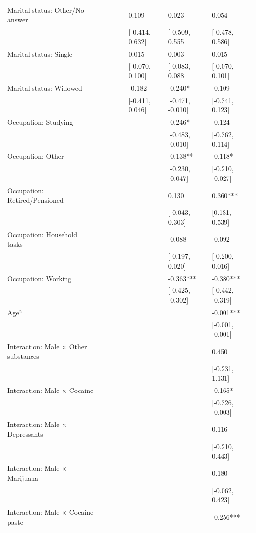 \documentclass[
  spanish,
  10pt,
]{article}
\begin{document}
\begin{table}[H]
{\begin{tabular}[t]{llllllll}
Marital status: Other/No answer &  &  &  &  & 0.109 & 0.023 & 0.054\\
 &  &  &  &  & {}[-0.414, 0.632] & {}[-0.509, 0.555] & {}[-0.478, 0.586]\\
Marital status: Single &  &  &  &  & 0.015 & 0.003 & 0.015\\
 &  &  &  &  & {}[-0.070, 0.100] & {}[-0.083, 0.088] & {}[-0.070, 0.101]\\
Marital status: Widowed &  &  &  &  & -0.182 & -0.240* & -0.109\\
 &  &  &  &  & {}[-0.411, 0.046] & {}[-0.471, -0.010] & {}[-0.341, 0.123]\\
Occupation: Studying &  &  &  &  &  & -0.246* & -0.124\\
 &  &  &  &  &  & {}[-0.483, -0.010] & {}[-0.362, 0.114]\\
Occupation: Other &  &  &  &  &  & -0.138** & -0.118*\\
 &  &  &  &  &  & {}[-0.230, -0.047] & {}[-0.210, -0.027]\\
Occupation: Retired/Pensioned &  &  &  &  &  & 0.130 & 0.360***\\
 &  &  &  &  &  & {}[-0.043, 0.303] & {}[0.181, 0.539]\\
Occupation: Household tasks &  &  &  &  &  & -0.088 & -0.092\\
 &  &  &  &  &  & {}[-0.197, 0.020] & {}[-0.200, 0.016]\\
Occupation: Working &  &  &  &  &  & -0.363*** & -0.380***\\
 &  &  &  &  &  & {}[-0.425, -0.302] & {}[-0.442, -0.319]\\
Age² &  &  &  &  &  &  & -0.001***\\
 &  &  &  &  &  &  & {}[-0.001, -0.001]\\
Interaction: Male × Other substances &  &  &  &  &  &  & 0.450\\
 &  &  &  &  &  &  & {}[-0.231, 1.131]\\
Interaction: Male × Cocaine &  &  &  &  &  &  & -0.165*\\
 &  &  &  &  &  &  & {}[-0.326, -0.003]\\
Interaction: Male × Depressants &  &  &  &  &  &  & 0.116\\
 &  &  &  &  &  &  & {}[-0.210, 0.443]\\
Interaction: Male × Marijuana &  &  &  &  &  &  & 0.180\\
 &  &  &  &  &  &  & {}[-0.062, 0.423]\\
Interaction: Male × Cocaine paste &  &  &  &  &  &  & -0.256***\\

\end{tabular}}
\end{table}
\end{document}
